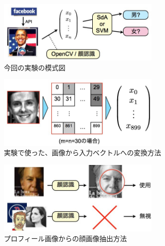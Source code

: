 \begin{figure}[tbp]
 \begin{center}
  \includegraphics[width=80mm]{img/c7/expr}
 \end{center}
 \caption{今回の実験の模式図}
 \label{c7_expr}
\end{figure}

\begin{figure}[tbp]
 \begin{center}
  \includegraphics[width=80mm]{img/c7/conv}
 \end{center}
 \caption{実験で使った、画像から入力ベクトルへの変換方法}
 \label{c7_conv}
\end{figure}

\begin{figure}[tbp]
 \begin{center}
  \includegraphics[width=80mm]{img/c7/pic_judge}
 \end{center}
 \caption{プロフィール画像からの顔画像抽出方法}
 \label{c7_pic_judge}
\end{figure}

